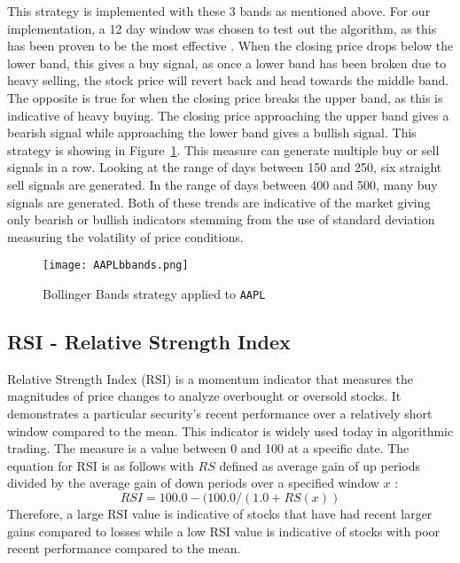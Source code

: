 \documentclass[../thesis.tex]{subfiles}
\begin{document}
This strategy is implemented with these 3 bands as mentioned above. For our implementation, a 12 day window was chosen to test out the algorithm, as this has been proven to be the most effective \cite{Liu2006}. When the closing price drops below the lower band, this gives a buy signal, as once a lower band has been broken due to heavy selling, the stock price will revert back and head towards the middle band. The opposite is true for when the closing price breaks the upper band, as this is indicative of heavy buying. The closing price approaching the upper band gives a bearish signal while approaching the lower band gives a bullish signal.  This strategy is showing in Figure~\ref{BBANDSfigure}. This measure can generate multiple buy or sell signals in a row. Looking at the range of days between 150 and 250, six straight sell signals are generated. In the range of days between 400 and 500, many buy signals are generated. Both of these trends are indicative of the market giving only bearish or bullish indicators stemming from the use of standard deviation measuring the volatility of price conditions.

\begin{figure}[h]
\centering
\texttt{[image: AAPLbbands.png]}
\caption{Bollinger Bands strategy applied to \texttt{AAPL}  \label{overflow}}
\label{BBANDSfigure}
\end{figure}

\subsection{RSI - Relative Strength Index}

Relative Strength Index (RSI) is a momentum indicator that measures the magnitudes of price changes to analyze overbought or oversold stocks. It demonstrates a particular security's recent performance over a relatively short window compared to the mean. This indicator is widely used today in algorithmic trading. The measure is a value between 0 and 100 at a specific date. The equation for RSI is as follows with $RS$ defined as average gain of up periods divided by the average gain of down periods over a specified window $x$ \cite{Chong2014}: \[RSI = 100.0 - (100.0 / (1.0 + RS(x))\] Therefore, a large RSI value is indicative of stocks that have had recent larger gains compared to losses while a low RSI value is indicative of stocks with poor recent performance compared to the mean.
\end{document}
